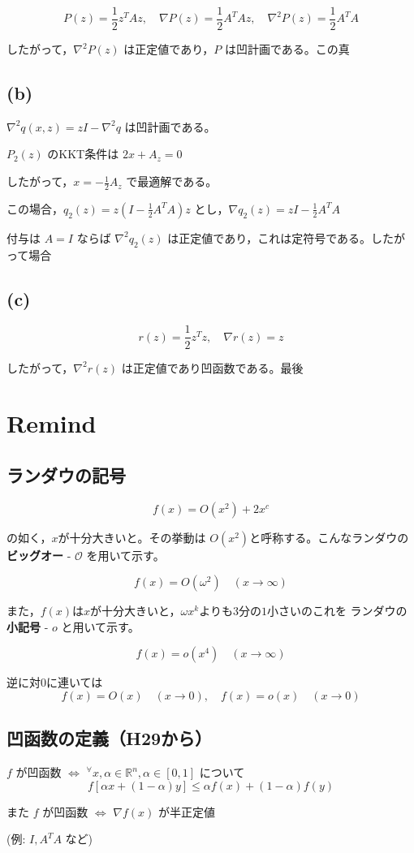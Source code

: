 \documentclass[12pt,a4paper]{article}
\begin{document}
\[P(z) = \frac{1}{2}z^T A z, \quad \nabla P(z) = \frac{1}{2}A^T A z, \quad \nabla^2 P(z) = \frac{1}{2}A^T A\]

したがって，$\nabla^2 P(z)$ は正定値であり，$P$ は凹計画である。この真

\subsection*{(b)}

$\nabla^2 q(x,z) = zI - \nabla^2 q$ は凹計画である。

$P_2(z)$ のKKT条件は $2x + A_z = 0$

したがって，$x = -\frac{1}{2}A_z$ で最適解である。

この場合，$q_2(z) = z(I - \frac{1}{2}A^T A)z$ とし，$\nabla q_2(z) = zI - \frac{1}{2}A^T A$

付与は $A = I$ ならば $\nabla^2 q_2(z)$ は正定値であり，これは定符号である。したがって場合

\subsection*{(c)}

\[r(z) = \frac{1}{2}z^T z, \quad \nabla r(z) = z\]

したがって，$\nabla^2 r(z)$ は正定値であり凹函数である。最後

\newpage

\section*{Remind}

\subsection*{ランダウの記号}

\[f(x) = O(x^2) + 2x^c\]

の如く，$x$が十分大きいと。その挙動は $O(x^2)$と呼称する。こんなランダウの\textbf{ビッグオー} - $\mathcal{O}$ を用いて示す。

\[f(x) = O(\omega^2) \quad (x \to \infty)\]

また，$f(x)$は$x$が十分大きいと，$\omega x^k$よりも$3$分の$1$小さいのこれを
ランダウの\textbf{小記号} - $o$ と用いて示す。

\[f(x) = o(x^4) \quad (x \to \infty)\]

逆に対$0$に連いては
\[f(x) = O(x) \quad (x \to 0), \quad f(x) = o(x) \quad (x \to 0)\]

\subsection*{凹函数の定義（H29から）}

$f$ が凹函数 $\Leftrightarrow$ ${}^\forall x, \alpha \in \mathbb{R}^n, \alpha \in [0,1]$ について
\[f[\alpha x + (1-\alpha)y] \leq \alpha f(x) + (1-\alpha)f(y)\]

また $f$ が凹函数 $\Leftrightarrow$ $\nabla f(x)$ が半正定値

(例: $I, A^T A$ など)
\end{document}

